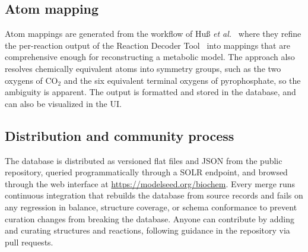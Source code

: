 \documentclass[unnumsec,webpdf,modern,large]{oup-authoring-template}
\newcommand{\modelseedurl}{\url{https://modelseed.org/biochem}}
\begin{document}
\subsection{Atom mapping}\label{sec:methods-mapping}

Atom mappings are generated from the workflow of Hu{\ss} \textit{et al.}~\cite{huss2022} where they refine the per-reaction output of the Reaction Decoder Tool~\cite{rahman2016} into mappings that are comprehensive enough for reconstructing a metabolic model.
The approach also resolves chemically equivalent atoms into symmetry groups, such as the two oxygens of CO$_2$ and the six equivalent terminal oxygens of pyrophosphate, so the ambiguity is apparent.
The output is formatted and stored in the database, and can also be visualized in the UI.
\subsection{Distribution and community process}\label{sec:methods-distribution}

The database is distributed as versioned flat files and JSON from the public repository, queried programmatically through a SOLR endpoint, and browsed through the web interface at \modelseedurl.
Every merge runs continuous integration that rebuilds the database from source records and fails on any regression in balance, structure coverage, or schema conformance to prevent curation changes from breaking the database.
Anyone can contribute by adding and curating structures and reactions, following guidance in the repository via pull requests.
\end{document}
